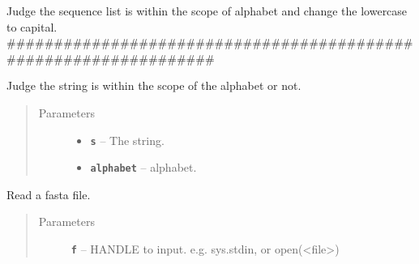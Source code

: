 \documentclass[letterpaper,10pt,english]{sphinxmanual}
\begin{document}

\begin{fulllineitems}
\label{reference/PyPretreatDNA:PyPretreatDNA.IsSequenceList}
Judge the sequence list is within the scope of alphabet and 
change the lowercase to capital.
\#\#\#\#\#\#\#\#\#\#\#\#\#\#\#\#\#\#\#\#\#\#\#\#\#\#\#\#\#\#\#\#\#\#\#\#\#\#\#\#\#\#\#\#\#\#\#\#\#\#\#\#\#\#\#\#\#\#\#\#\#\#\#\#\#

\end{fulllineitems}


\begin{fulllineitems}
\label{reference/PyPretreatDNA:PyPretreatDNA.IsUnderAlphabet}
Judge the string is within the scope of the alphabet or not.
\begin{quote}\begin{description}
\item[{Parameters}] \leavevmode\begin{itemize}
\item {} 
\textbf{\texttt{s}} -- The string.

\item {} 
\textbf{\texttt{alphabet}} -- alphabet.

\end{itemize}

\end{description}\end{quote}

\end{fulllineitems}


\begin{fulllineitems}
\label{reference/PyPretreatDNA:PyPretreatDNA.NormalizeIndex}
\end{fulllineitems}


\begin{fulllineitems}
\label{reference/PyPretreatDNA:PyPretreatDNA.ReadFasta}
Read a fasta file.
\begin{quote}\begin{description}
\item[{Parameters}] \leavevmode
\textbf{\texttt{f}} -- HANDLE to input. e.g. sys.stdin, or open(\textless{}file\textgreater{})

\end{description}\end{quote}

\end{fulllineitems}
\end{document}
